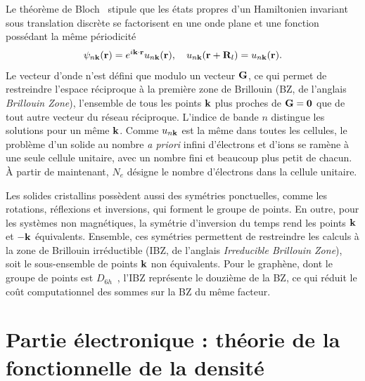 Le théorème de Bloch~\cite{blochUeberQuantenmechanikElektronen1929} stipule que les états propres d'un Hamiltonien invariant sous translation discrète se factorisent en une onde plane et une fonction possédant la même périodicité
\begin{equation}
    \psi_{n\mathbf{k}}(\mathbf{r})=e^{i\mathbf{k}\cdot\mathbf{r}}u_{n\mathbf{k}}(\mathbf{r}),\quad u_{n\mathbf{k}}(\mathbf{r}+\mathbf{R}_l)=u_{n\mathbf{k}}(\mathbf{r}).
    \label{eqn:c2_bloch_thm}
\end{equation}
Le vecteur d'onde n'est défini que modulo un vecteur $\mathbf{G}$, ce qui permet de restreindre l'espace réciproque à la première zone de Brillouin (BZ, de l'anglais \textit{Brillouin Zone}), l'ensemble de tous les points $\mathbf{k}$ plus proches de $\mathbf{G}=\bm 0$ que de tout autre vecteur du réseau réciproque. L'indice de bande $n$ distingue les solutions pour un même $\mathbf{k}$. Comme $u_{n\mathbf{k}}$ est la même dans toutes les cellules, le problème d'un solide au nombre \textit{a priori} infini d'électrons et d'ions se ramène à une seule cellule unitaire, avec un nombre fini et beaucoup plus petit de chacun. À partir de maintenant, $N_e$ désigne le nombre d'électrons dans la cellule unitaire.

Les solides cristallins possèdent aussi des symétries ponctuelles, comme les rotations, réflexions et inversions, qui forment le groupe de points. En outre, pour les systèmes non magnétiques, la symétrie d'inversion du temps rend les points $\mathbf{k}$ et $-\mathbf{k}$ équivalents. Ensemble, ces symétries permettent de restreindre les calculs à la zone de Brillouin irréductible (IBZ, de l'anglais \textit{Irreducible Brillouin Zone}), soit le sous-ensemble de points $\mathbf{k}$ non équivalents. Pour le graphène, dont le groupe de points est $D_{6h}$~\cite{dresselhausPhysicalPropertiesCarbon1998,castronetoElectronicPropertiesGraphene2009}, l'IBZ représente le douzième de la BZ, ce qui réduit le coût computationnel des sommes sur la BZ du même facteur.

\section{Partie électronique : théorie de la fonctionnelle de la densité}\label{sec:électrons}

